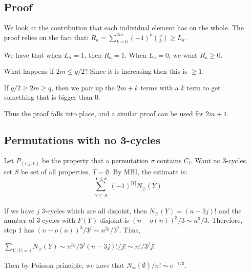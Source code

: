 \documentclass[]{article}
\theoremstyle{definition}
\numberwithin{theorem}{section}
\numberwithin{equation}{section}
\begin{document}
\subsection{Proof}
We look at the contribution that each individual element has on the whole. 
The proof relies on the fact that:
$R_a = \sum_{k = 0}^{2m} (-1)^k \binom{q}{k} \geq L_a$. 

We have that when $L_a = 1$, then $R_a = 1$. When $L_a = 0$, we want $R_a \geq 0$. 

What happens if $2m \leq q/2$? Since it is increasing then this is $\geq 1$.

If $q/2 \geq 2m \geq q$, then we pair up the $2m + k$ terms with a $k$ term to get something that is bigger than 0.

Thus the proof falls into place, and a similar proof can be used for $2m + 1$. 

\subsection{Permutations with no 3-cycles}
Let $P_{(i,j,k)}$ be the property that a permutation $\sigma$ contains $C_i$. Want no 3-cycles. set $S$ be set of all properties, $T = \emptyset$. By MBI, the estimate is:
\begin{equation}
	\sum_{\substack{Y \subseteq S}}^{Y \leq k} (-1)^{|Y|} N_\geq(Y)
\end{equation}

If we have $j$ 3-cycles which are all disjoint, then $N_\geq(Y) = (n - 3j)!$ and the number of 3-cycles with $F(Y)$ disjoint is $(n - o(n))^3/3 \sim n^3/ 3$. Therefore, step $1$ has $(n - o(n))^3/3^j \sim n^{3j}/3^j$. Thus, 

$\sum_{Y, |Y| = j} N_\geq (Y) \sim n^{3j}/3^j (n - 3j)!/j! \sim n!/3^j j!$

Then by Poisson principle, we have that $N_=(\emptyset)/n! \sim e^{- 1/3}$. 
\end{document}
